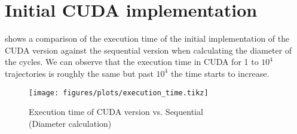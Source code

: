 \section{Initial CUDA implementation}

 shows a comparison of the execution time of the initial
implementation of the CUDA version against the sequential version when
calculating the diameter of the cycles. We can observe that the execution time
in CUDA for 1 to $10^4$ trajectories is roughly the same but past $10^4$ the
time starts to increase.

\begin{figure}[H]
    \centering
    \texttt{[image: figures/plots/execution\_time.tikz]}
    \caption{Execution time of CUDA version vs. Sequential \\ (Diameter
    calculation)}%
    \label{fig:time_cuda}
\end{figure}
